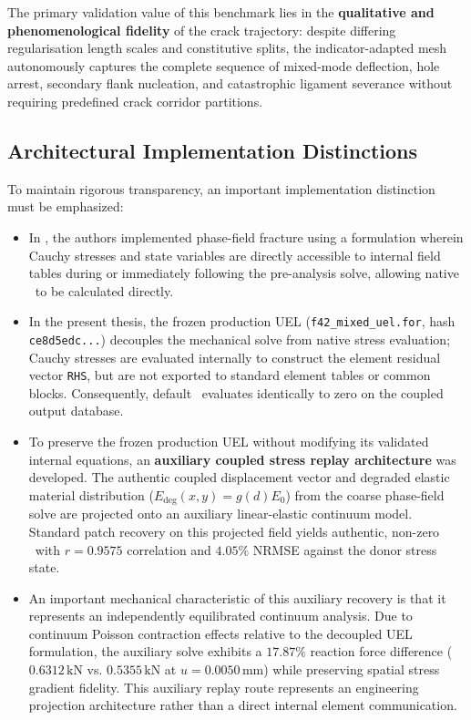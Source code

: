 The primary validation value of this benchmark lies in the \textbf{qualitative and phenomenological fidelity} of the crack trajectory: despite differing regularisation length scales and constitutive splits, the indicator-adapted mesh autonomously captures the complete sequence of mixed-mode deflection, hole arrest, secondary flank nucleation, and catastrophic ligament severance without requiring predefined crack corridor partitions.

\subsection{Architectural Implementation Distinctions}
\label{subsec:hole_architectural_distinction}

To maintain rigorous transparency, an important implementation distinction must be emphasized:
\begin{itemize}
  \item In \citet{pandey2025}, the authors implemented phase-field fracture using a formulation wherein Cauchy stresses and state variables are directly accessible to \Abaqus internal field tables during or immediately following the pre-analysis solve, allowing native \MISESERI\ to be calculated directly.
  \item In the present thesis, the frozen production UEL (\texttt{f42\_mixed\_uel.for}, hash \texttt{ce8d5edc...}) decouples the mechanical solve from native \Abaqus stress evaluation; Cauchy stresses are evaluated internally to construct the element residual vector \texttt{RHS}, but are not exported to standard element tables or common blocks. Consequently, default \MISESERI\ evaluates identically to zero on the coupled output database.
  \item To preserve the frozen production UEL without modifying its validated internal equations, an \textbf{auxiliary coupled stress replay architecture} was developed. The authentic coupled displacement vector and degraded elastic material distribution ($E_{\mathrm{deg}}(x,y) = g(d) E_0$) from the coarse phase-field solve are projected onto an auxiliary linear-elastic continuum model. Standard patch recovery on this projected field yields authentic, non-zero \MISESERI\ with $r = 0.9575$ correlation and $4.05\%$ NRMSE against the donor stress state.
  \item An important mechanical characteristic of this auxiliary recovery is that it represents an independently equilibrated continuum analysis. Due to continuum Poisson contraction effects relative to the decoupled UEL formulation, the auxiliary solve exhibits a $17.87\%$ reaction force difference ($0.6312\,\mathrm{kN}$ vs. $0.5355\,\mathrm{kN}$ at $u = 0.0050\,\mathrm{mm}$) while preserving spatial stress gradient fidelity. This auxiliary replay route represents an engineering projection architecture rather than a direct internal element communication.
\end{itemize}

